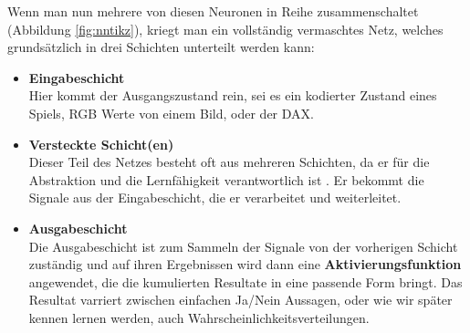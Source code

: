             \noindent
            Wenn man nun mehrere von diesen Neuronen in Reihe zusammenschaltet (Abbildung \ref{fig:nntikz}), kriegt man ein vollständig vermaschtes Netz, welches grundsätzlich in drei Schichten unterteilt werden kann:
            \begin{itemize}
                \setlength{\itemsep}{8pt}
                \item \textbf{Eingabeschicht} \\
                    Hier kommt der Ausgangszustand rein, sei es ein kodierter Zustand eines Spiels, RGB Werte von einem Bild, oder der DAX.
                \item \textbf{Versteckte Schicht(en)} \\
                    Dieser Teil des Netzes besteht oft aus mehreren Schichten, da er für die Abstraktion und die Lernfähigkeit verantwortlich ist \cite{ANNModeling}. Er bekommt die Signale aus der Eingabeschicht, die er verarbeitet und weiterleitet.

\newpage

                \item \textbf{Ausgabeschicht} \\
                    Die Ausgabeschicht ist zum Sammeln der Signale von der vorherigen Schicht zuständig und auf ihren Ergebnissen wird dann eine \textbf{Aktivierungsfunktion} angewendet, die die kumulierten Resultate in eine passende Form bringt. Das Resultat varriert zwischen einfachen Ja/Nein Aussagen, oder wie wir später kennen lernen werden, auch Wahrscheinlichkeitsverteilungen.

            \end{itemize}


